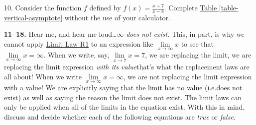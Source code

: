 \documentclass[10pt,oneside,]{book}
\theoremstyle{plain}
\theoremstyle{definition}
\numberwithin{equation}{section}
\newcommand{\hrulemedium}{\noalign{\hrule height 0.07em}}
\newcommand{\hrulethick} {\noalign{\hrule height 0.11em}}
\newcounter{figstack}
\newcounter{figindex}
\newlength\fight
\newcommand\pushValignCaptionBottom[5][b]{%
\stepcounter{figstack}%
\expandafter\def\csname %
figalign\romannumeral\value{figstack}\endcsname{#1}%
\expandafter\def\csname %
figtype\romannumeral\value{figstack}\endcsname{#2}%
\expandafter\def\csname %
figwd\romannumeral\value{figstack}\endcsname{#3}%
\expandafter\def\csname %
figcontent\romannumeral\value{figstack}\endcsname{#4}%
\expandafter\def\csname %
figcap\romannumeral\value{figstack}\endcsname{#5}%
\setbox0=\hbox{%
\begin{#2}{#3}#4\end{#2}}%
\ifdim\dimexpr\ht0+\dp0\relax>\fight\global\setlength{\fight}{%
\dimexpr\ht0+\dp0\relax}\fi%
}
\newcommand\popValignCaptionBottom{%
\setcounter{figindex}{0}%
\hfill%
\whiledo{\value{figindex}<\value{figstack}}{%
\stepcounter{figindex}%
\def\tmp{\csname figwd\romannumeral\value{figindex}\endcsname}%
\begin{\csname figtype\romannumeral\value{figindex}\endcsname}[t]{\tmp}%
\centering%
\stackinset{c}{}%
{\csname figalign\romannumeral\value{figindex}\endcsname}{}%
{\csname figcontent\romannumeral\value{figindex}\endcsname}%
{\rule{0pt}{\fight}}\par%
\csname figcap\romannumeral\value{figindex}\endcsname%
\end{\csname figtype\romannumeral\value{figindex}\endcsname}%
\hfill%
}%
\setcounter{figstack}{0}%
\setlength{\fight}{0pt}%
\hfill%
}
\newcommand{\fe}[2]{#1\mathopen{}\left(#2\right)\mathclose{}}
\begin{document}
\begin{exerciselist}
\item[10.]\hypertarget{exercise-99}{\null}Consider the function \(f\) defined by \(\fe{f}{x}=\frac{x+7}{x-8}\). Complete \hyperref[table-vertical-asymptote]{Table \ref{table-vertical-asymptote}} without the use of your calculator.%
\par\smallskip
\textbf{11--18. }\hypertarget{exercisegroup-hear-me}{\null}Hear me, and hear me loud\dots{}\(\infty\) \emph{does not exist}. This, in part, is why we cannot apply \hyperref[llr1]{Limit Law R1} to an expression like \(\lim\limits_{x\to\infty}x\) to see that \(\lim\limits_{x\to\infty}x=\infty\). When we write, say, \(\lim\limits_{x\to7}x=7\), we are replacing the limit, we are replacing the limit expression \emph{with its value}\textemdash{}that's what the replacement laws are all about! When we write \(\lim\limits_{x\to\infty}x=\infty\), we are not replacing the limit expression with a value! We are explicitly saying that the limit has no value (i.e.\@ does not exist) as well as saying the reason the limit does not exist. The limit laws can only be applied when all of the limits in the equation exist. With this in mind, discuss and decide whether each of the following equations are \emph{true} or \emph{false}.%

\end{exerciselist}
\end{document}
